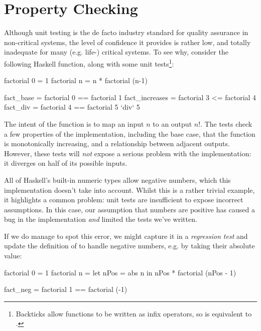 \section{Property Checking}
\label{sec:propertychecking}


Although unit testing is the de facto industry standard for quality assurance in
non-critical systems, the level of confidence it provides is rather low, and
totally inadequate for many (e.g. life-) critical systems. To see why, consider
the following Haskell function, along with some unit
tests\footnote{Backticks allow functions to be written as infix operators, so
   is equivalent to .}:

\begin{haskell}
factorial 0 = 1
factorial n = n * factorial (n-1)

fact_base      = factorial 0 == factorial 1
fact_increases = factorial 3 <= factorial 4
fact_div       = factorial 4 == factorial 5 `div` 5
\end{haskell}

The intent of the function is to map an input $n$ to an output $n!$. The tests
check a few properties of the implementation, including the base case, that the
function is monotonically increasing, and a relationship between adjacent
outputs. However, these tests will \emph{not} expose a serious problem with the
implementation: it diverges on half of its possible inputs.

All of Haskell's built-in numeric types allow negative numbers, which this
implementation doesn't take into account. Whilst this is a rather trivial
example, it highlights a common problem: unit tests are insufficient to expose
incorrect assumptions. In this case, our assumption that numbers are positive
has caused a bug in the implementation \emph{and} limited the tests we've
written.

If we do manage to spot this error, we might capture it in a \emph{regression
  test} and update the definition of  to handle negative numbers,
e.g. by taking their absolute value:

\begin{haskell}
factorial 0 = 1
factorial n = let nPos = abs n
               in nPos * factorial (nPos - 1)

fact_neg = factorial 1 == factorial (-1)
\end{haskell}


